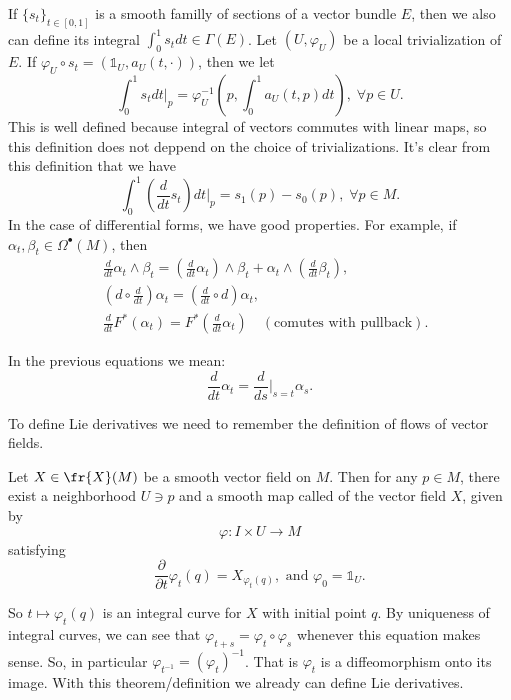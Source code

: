 If $\{s_t\}_{t\in[0,1]}$ is a smooth familly of sections of a vector bundle $E$, then we also can define its integral 
$\int_0^1s_tdt \in\Gamma(E)$. Let $(U,\varphi_U)$ be a local trivialization of $E$. If $\varphi_U\circ s_t=(\mathds{1}_U,a_U(t,\cdot))$, then we let 
\begin{equation}
    \int_0^1s_tdt\bigg|_p = \varphi_U^{-1}(p,\int_0^1a_U(t,p)dt),\;\forall p\in U.
\end{equation}
This is well defined because integral of vectors commutes with linear maps, so this definition does not deppend 
on the choice of trivializations. It's clear from this definition that we have 
\begin{equation}
    \int_0^1(\frac{d}{dt}s_t)dt\bigg|_p = s_1(p)-s_0(p),\;\forall p\in M.
\end{equation}
In the case of differential forms, we have good properties. For example, if $\alpha_t,\beta_t\in\Omega^\bullet(M)$, then 
\begin{equation}
    \begin{aligned}
        &\frac{d}{dt}\alpha_t\wedge\beta_t =(\frac{d}{dt}\alpha_t)\wedge\beta_t+\alpha_t\wedge(\frac{d}{dt}\beta_t),\\
        &(d\circ \frac{d}{dt})\alpha_t=(\frac{d}{dt}\circ d)\alpha_t,\\
        &\frac{d}{dt}F^*(\alpha_t)=F^*(\frac{d}{dt}\alpha_t)\quad(\text{comutes with pullback}).
    \end{aligned}
\end{equation}
\begin{remark}
    In the previous equations we mean: 
    \begin{equation}
        \frac{d}{dt}\alpha_t = \frac{d}{ds}\bigg|_{s=t}\alpha_s.
    \end{equation}
\end{remark}


To define Lie derivatives we need to remember the definition of flows of vector fields.
\begin{dang}
    \begin{theorem}
        Let $X\in \fr{X}(M)$ be a smooth vector field on $M$. Then for any $p\in M$, there exist a 
        neighborhood $U\ni p$ and a smooth map called  of the vector field $X$, given by 
        \begin{equation}
            \varphi: I\times U\rightarrow M
        \end{equation}
        satisfying
        \begin{equation}
            \frac{\partial}{\partial t}\varphi_t(q)=X_{\varphi_t(q)},\text{ and }\varphi_0=\mathds{1}_U.
        \end{equation}
    \end{theorem}
\end{dang}
So $t\mapsto \varphi_t(q)$ is an integral curve for $X$ with initial point $q$. By uniqueness of integral curves, we can see 
that $\varphi_{t+s}=\varphi_t\circ\varphi_s$ whenever this equation makes sense. So, in particular 
$\varphi_{t^{-1}}=(\varphi_{t})^{-1}$. That is $\varphi_t$ is a diffeomorphism onto its image. With this theorem/definition we 
already can define Lie derivatives.

